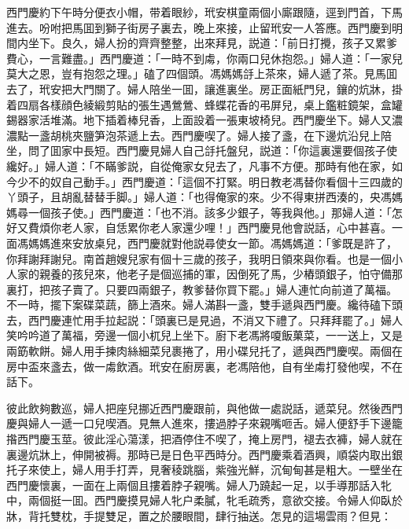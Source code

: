 西門慶約下午時分便衣小帽，带着眼紗，玳安棋童兩個小廝跟隨，逕到門首，下馬進去。吩咐把馬囬到獅子街房子裏去，晚上來接，止留玳安一人答應。西門慶到明間内坐下。良久，婦人扮的齊齊整整，出來拜見，説道：「前日打攪，孩子又累爹費心，一言難盡。」西門慶道：「一時不到䖏，你兩口兒休抱怨。」婦人道：「一家兒莫大之恩，豈有抱怨之理。」磕了四個頭。馮媽媽㧱上茶來，婦人遞了茶。見馬囬去了，玳安把大門關了。婦人陪坐一囬，讓進裏坐。房正面紙門兒，鑲的炕牀，掛着四扇各樣顔色綾緞剪貼的張生遇鶯鶯、蜂蝶花香的弔屏兒，桌上鑑粧鏡架，盒罐錫器家活堆滿。地下插着棒兒香，上面設着一張東坡椅兒。西門慶坐下。婦人又濃濃點一盞胡桃夾鹽笋泡茶遞上去。西門慶喫了。婦人接了盞，在下邊炕沿兒上陪坐，問了囬家中長短。西門慶見婦人自己㧱托盤兒，説道：「你這裏還要個孩子使纔好。」婦人道：「不瞞爹説，自從俺家女兒去了，凡事不方便。那時有他在家，如今少不的奴自己動手。」西門慶道：「這個不打緊。明日教老馮替你看個十三四歲的丫頭子，且胡亂替替手脚。」婦人道：「也得俺家的來。少不得東拼西湊的，央馮媽媽尋一個孩子使。」西門慶道：「也不消。該多少銀子，等我與他。」那婦人道：「怎好又費煩你老人家，自恁累你老人家還少哩！」西門慶見他會説話，心中甚喜。一面馮媽媽進來安放桌兒，西門慶就對他説尋使女一節。馮媽媽道：「爹既是許了，你拜謝拜謝兒。南首趙嫂兒家有個十三歲的孩子，我明日領來與你看。也是一個小人家的親養的孩兒來，他老子是個巡捕的軍，因倒死了馬，少樁頭銀子，怕守備那裏打，把孩子賣了。只要四兩銀子，教爹替你買下罷。」婦人連忙向前道了萬福。不一時，擺下案碟菜蔬，篩上酒來。婦人滿斟一盞，雙手遞與西門慶。纔待磕下頭去，西門慶連忙用手拉起説：「頭裏已是見過，不消又下禮了。只拜拜罷了。」婦人笑吟吟道了萬福，旁邊一個小杌兒上坐下。廚下老馮將嗄飯菓菜，一一送上，又是兩筯軟餅。婦人用手揀肉絲細菜兒裹捲了，用小碟兒托了，遞與西門慶喫。兩個在房中盃來盞去，做一䖏飲酒。玳安在廚房裏，老馮陪他，自有坐䖏打發他喫，不在話下。

彼此飲夠數巡，婦人把座兒挪近西門慶跟前，與他做一處説話，遞菜兒。然後西門慶與婦人一遞一口兒喫酒。見無人進來，摟過脖子來親嘴咂舌。婦人便舒手下邊籠揝西門慶玉莖。彼此淫心蕩漾，把酒停住不喫了，掩上房門，褪去衣褲，婦人就在裏邊炕牀上，伸開被褥。那時已是日色平西時分。西門慶乘着酒興，順袋内取出銀托子來使上，婦人用手打弄，見奢稜跳腦，紫強光鮮，沉甸甸甚是粗大。一壁坐在西門慶懷裏，一面在上兩個且摟着脖子親嘴。婦人乃蹺起一足，以手導那話入牝中，兩個挺一囬。西門慶摸見婦人牝户柔膩，牝毛疏秀，意欲交接。令婦人仰臥於牀，背托雙枕，手提雙足，置之於腰眼間，肆行抽送。怎見的這場雲雨？但見：

